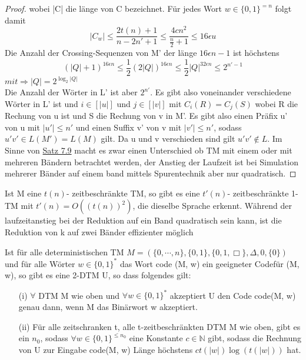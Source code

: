 \begin{proof}
        wobei |C| die länge von C bezeichnet. Für jedes Wort \(w \in \{0, 1\}^{=n}\) folgt damit 
        \[
            |C_w| \leq \frac{2t(n)+1}{n-2n' + 1} \leq \frac{4cn^2}{\frac{n}{2} + 1} \leq 16\epsilon u    
        \]
        Die Anzahl der Crossing-Sequenzen von M' der länge \(16\epsilon n -1\) ist höchstens 
        \[
            (|Q| + 1)^{16\epsilon n} \leq \frac{1}{2} (2|Q|)^{16 \epsilon n} \leq \frac{1}{2} |Q|^{32 \epsilon n} \leq 2^{n'-1} 
        \]
        \(mit \Rightarrow |Q| = 2^{\log_2 |Q|}\) \\ Die Anzahl der Wörter in L' ist aber \(2^{n'}\). Es gibt also voneinander verschiedene Wörter in L' ist und \(i \in [|u|]\) und \(j \in [|v|]\) mit \(C_i(R) = C_j(S)\) wobei R die Rechung von u ist und S die Rechung von v in M'. Es gibt also einen Präfix u' von u mit \(|u'| \leq n'\) und einen Suffix v' von v mit \(|v'| \leq n'\), sodass \(u' v' \in L(M') = L(M)\) gilt. Da u und v verschieden sind gilt \(u' v' \not \in L\). 
        \medskip
        Im Sinne von \hyperref[subsec:7.9]{Satz 7.9} macht es zwar einen Unterschied ob TM mit einem oder mit mehreren Bändern betrachtet werden, der Anstieg der Laufzeit ist bei Simulation mehrerer Bänder auf einem band mittels Spurentechnik aber nur quadratisch.
    \end{proof}

    Ist M eine \(t(n)\)- zeitbeschränkte TM, so gibt es eine \(t'(n)\)- zeitbeschränkte 1-TM mit \(t'(n) = O((t(n))^2)\), die dieselbe Sprache erkennt. Während der laufzeitanstieg bei der Reduktion auf ein Band quadratisch sein kann, ist die Reduktion von k auf zwei Bänder effizienter möglich 

    Ist für alle deterministischen TM \(M = (\{0, \cdots, n\}, \{0, 1\}, \{0, 1, \Box\}, \Delta, 0, \{0\})\) und für alle Wörter \(w \in \{0, 1\}^*\) das Wort code (M, w) ein geeigneter Codefür (M, w), so gibt es eine 2-DTM U, so dass folgendes gilt:

    \begin{itemize}
        \item [(i)] \(\forall\) DTM M wie oben und \(\forall w \in \{0, 1\}^*\) akzeptiert U den Code code(M, w) genau dann, wenn M das Binärwort w akzeptiert.
        \item [(ii)] Für alle zeitschranken t, alle t-zeitbeschränkten DTM M wie oben, gibt es ein \(n_0\), sodass \(\forall w \in \{0, 1\}^{\leq n_0}\) eine Konstante \(c \in \mathbb{N}\) gibt, sodass die Rechnung von U zur Eingabe code(M, w) Länge höchstens \(ct(|w|)\log(t(|w|))\) hat.
    \end{itemize}

